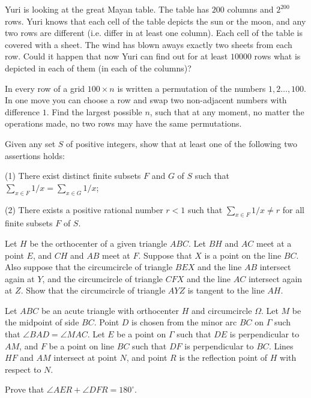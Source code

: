\documentclass[11pt]{scrartcl}
\begin{document}
\begin{problem}[825542457780626]
Yuri is looking at the great Mayan table. The table has $200$ columns and $2^{200}$ rows. Yuri knows that each cell of the table depicts the sun or the moon, and any two rows are different (i.e. differ in at least one column). Each cell of the table is covered with a sheet. The wind has blown aways exactly two sheets from each row. Could it happen that now Yuri can find out for at least $10000$ rows what is depicted in each of them (in each of the columns)?
\end{problem}
\begin{problem}[5664985199661230516]
In every row of a grid $100 \times n$ is written a permutation of the numbers $1,2 \ldots, 100$. In one move you can choose a row and swap two non-adjacent numbers with difference $1$. Find the largest possible $n$, such that at any moment, no matter the operations made, no two rows may have the same permutations.
\end{problem}
\begin{problem}[120381541018683]
Given any set $S$ of positive integers, show that at least one of the following two assertions holds:

(1) There exist distinct finite subsets $F$ and $G$ of $S$ such that $\sum_{x\in F}1/x=\sum_{x\in G}1/x$;

(2) There exists a positive rational number $r<1$ such that $\sum_{x\in F}1/x\neq r$ for all finite subsets $F$ of $S$.
\end{problem}
\begin{problem}[119129720704350]
Let $H$ be the orthocenter of a given triangle $ABC$. Let $BH$ and $AC$ meet at a point $E$, and $CH$ and $AB$ meet at $F$. Suppose that $X$ is a point on the line $BC$. Also suppose that the circumcircle of triangle $BEX$ and the line $AB$ intersect again at $Y$, and the circumcircle of triangle $CFX$ and the line $AC$ intersect again at $Z$.
Show that the circumcircle of triangle $AYZ$ is tangent to the line $AH$.
\end{problem}
\begin{problem}[227919487650283]
Let $ABC$ be an acute triangle with orthocenter $H$ and circumcircle $\Omega$. Let $M$ be the midpoint of side $BC$. Point $D$ is chosen from the minor arc $BC$ on $\Gamma$ such that $\angle BAD = \angle MAC$. Let $E$ be a point on $\Gamma$ such that $DE$ is perpendicular to $AM$, and $F$ be a point on line $BC$ such that $DF$ is perpendicular to $BC$. Lines $HF$ and $AM$ intersect at point $N$, and point $R$ is the reflection point of $H$ with respect to $N$.

Prove that $\angle AER + \angle DFR = 180^\circ$.
\end{problem}
\end{document}
